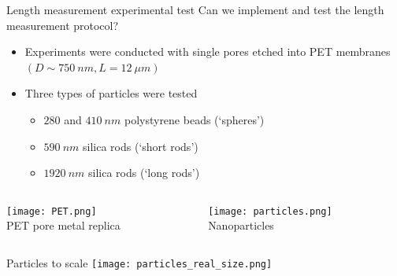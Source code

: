 \begin{frame}[c]{Length measurement experimental test}
	\textcolor{negativered}{Can we implement and test the length measurement protocol?} \\
	\begin{itemize}
		\item Experiments were conducted with single pores etched into PET membranes $\left(D\sim\SI{750}{nm}, L=\SI{12}{\mu m}\right)$
		\item Three types of particles were tested
		\begin{itemize}
			\item $280$ and $\SI{410}{nm}$ polystyrene beads  (`spheres')
			\item $\SI{590}{nm}$ silica rods (`short rods')
			\item $\SI{1920}{nm}$ silica rods (`long rods')
		\end{itemize}
	\end{itemize}
	
	\begin{columns}[t]
		\begin{column}[T]{2.25in}
			{\centering
				\texttt{[image: PET.png]} \\
				PET pore metal replica \\
				\par
			}
		\end{column}
		
		\begin{column}[T]{2.25in}
			{\centering
				\texttt{[image: particles.png]} \\
				Nanoparticles \\
				\par				
			}
		\end{column}

	\end{columns}



\end{frame}



\begin{frame}[c]{Particles to scale}
	\texttt{[image: particles\_real\_size.png]}
\end{frame}



